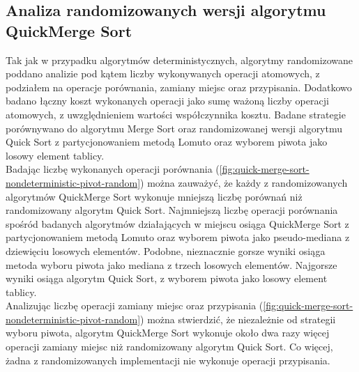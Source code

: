 \begin{figure}[]
	\centering
	
	\caption[]{}
	\label{fig:quick-merge-sort-deterministic-pivot-random}
\end{figure}

\subsection{Analiza randomizowanych wersji algorytmu QuickMerge Sort}
Tak jak w przypadku algorytmów deterministycznych, algorytmy randomizowane poddano analizie pod kątem liczby wykonywanych operacji atomowych, z podziałem na operacje porównania, zamiany miejsc oraz przypisania. Dodatkowo badano łączny koszt wykonanych operacji jako sumę ważoną liczby operacji atomowych, z uwzględnieniem wartości współczynnika kosztu. Badane strategie porównywano do algorytmu Merge Sort oraz randomizowanej wersji algorytmu Quick Sort z partycjonowaniem metodą Lomuto oraz wyborem piwota jako losowy element tablicy.\\

Badając liczbę wykonanych operacji porównania (\ref{fig:quick-merge-sort-nondeterministic-pivot-random}) można zauważyć, że każdy z randomizowanych algorytmów QuickMerge Sort wykonuje mniejszą liczbę porównań niż randomizowany algorytm Quick Sort. Najmniejszą liczbę operacji porównania spośród badanych algorytmów działających w miejscu osiąga QuickMerge Sort z partycjonowaniem metodą Lomuto oraz wyborem piwota jako pseudo-mediana z dziewięciu losowych elementów. Podobne, nieznacznie gorsze wyniki osiąga metoda wyboru piwota jako mediana z trzech losowych elementów. Najgorsze wyniki osiąga algorytm Quick Sort, z wyborem piwota jako losowy element tablicy.\\

Analizując liczbę operacji zamiany miejsc oraz przypisania (\ref{fig:quick-merge-sort-nondeterministic-pivot-random}) można stwierdzić, że niezależnie od strategii wyboru piwota, algorytm QuickMerge Sort wykonuje około dwa razy więcej operacji zamiany miejsc niż randomizowany algorytm Quick Sort. Co więcej, żadna z randomizowanych implementacji nie wykonuje operacji przypisania.\\

